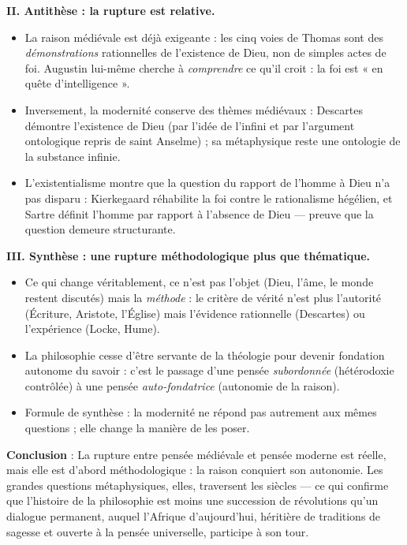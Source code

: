 \documentclass[11pt]{article}
\newcommand{\cle}[1]{{\popxbold\color{popdark}#1}}
\begin{document}
\begin{exoresolu}
\textbf{II. Antithèse : la rupture est relative.}
\begin{itemize}
\item La raison médiévale est déjà exigeante : les cinq voies de Thomas sont des \emph{démonstrations} rationnelles de l'existence de Dieu, non de simples actes de foi. Augustin lui-même cherche à \emph{comprendre} ce qu'il croit : la foi est « en quête d'intelligence ».
\item Inversement, la modernité conserve des thèmes médiévaux : Descartes démontre l'existence de Dieu (par l'idée de l'infini et par l'argument ontologique repris de saint Anselme) ; sa métaphysique reste une \cle{ontologie} de la substance infinie.
\item L'existentialisme montre que la question du rapport de l'homme à Dieu n'a pas disparu : Kierkegaard réhabilite la foi contre le rationalisme hégélien, et Sartre définit l'homme par rapport à l'absence de Dieu — preuve que la question demeure structurante.
\end{itemize}

\textbf{III. Synthèse : une rupture méthodologique plus que thématique.}
\begin{itemize}
\item Ce qui change véritablement, ce n'est pas l'objet (Dieu, l'âme, le monde restent discutés) mais la \emph{méthode} : le critère de vérité n'est plus l'autorité (Écriture, Aristote, l'Église) mais l'évidence rationnelle (Descartes) ou l'expérience (Locke, Hume).
\item La philosophie cesse d'être servante de la théologie pour devenir fondation autonome du savoir : c'est le passage d'une pensée \emph{subordonnée} (hétérodoxie contrôlée) à une pensée \emph{auto-fondatrice} (autonomie de la raison).
\item Formule de synthèse : la modernité ne répond pas autrement aux mêmes questions ; elle change la manière de les poser.
\end{itemize}

\textbf{Conclusion} : La rupture entre pensée médiévale et pensée moderne est réelle, mais elle est d'abord méthodologique : la raison conquiert son autonomie. Les grandes questions métaphysiques, elles, traversent les siècles — ce qui confirme que l'histoire de la philosophie est moins une succession de révolutions qu'un dialogue permanent, auquel l'Afrique d'aujourd'hui, héritière de traditions de sagesse et ouverte à la pensée universelle, participe à son tour.
\end{exoresolu}
\end{document}
